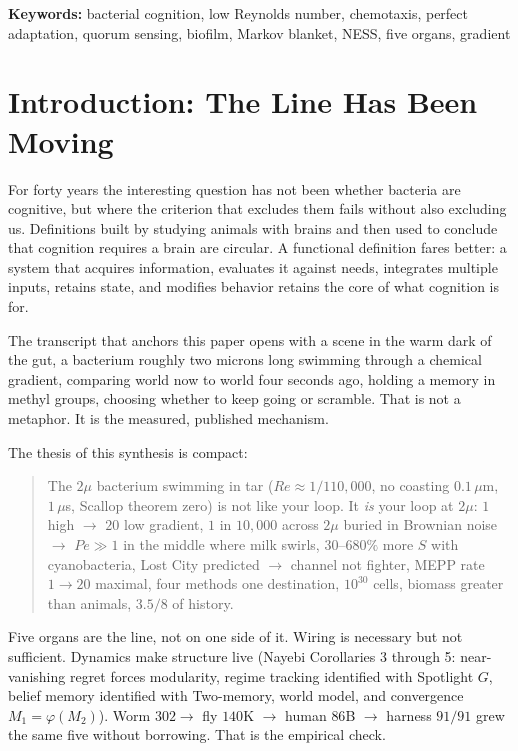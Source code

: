 \documentclass[11pt,a4paper]{article}
\begin{document}
\noindent\textbf{Keywords:} bacterial cognition, low Reynolds number, chemotaxis, perfect adaptation, quorum sensing, biofilm, Markov blanket, NESS, five organs, gradient

\tableofcontents
\newpage

\section{Introduction: The Line Has Been Moving}
\label{sec:intro}

For forty years the interesting question has not been whether bacteria are cognitive, but where the criterion that excludes them fails without also excluding us. Definitions built by studying animals with brains and then used to conclude that cognition requires a brain are circular. A functional definition fares better: a system that acquires information, evaluates it against needs, integrates multiple inputs, retains state, and modifies behavior retains the core of what cognition is for.

The transcript that anchors this paper opens with a scene in the warm dark of the gut, a bacterium roughly two microns long swimming through a chemical gradient, comparing world now to world four seconds ago, holding a memory in methyl groups, choosing whether to keep going or scramble. That is not a metaphor. It is the measured, published mechanism.

The thesis of this synthesis is compact:

\begin{quote}
The $2\mu$ bacterium swimming in tar ($Re \approx 1/110{,}000$, no coasting $0.1\,\mu$m, $1\,\mu$s, Scallop theorem zero) is not like your loop. It \textit{is} your loop at $2\mu$: $1$ high $\to$ $20$ low gradient, $1$ in $10{,}000$ across $2\mu$ buried in Brownian noise $\to$ $Pe \gg 1$ in the middle where milk swirls, $30$--$680\%$ more $S$ with cyanobacteria, Lost City predicted $\to$ channel not fighter, MEPP rate $1 \to 20$ maximal, four methods one destination, $10^{30}$ cells, biomass greater than animals, $3.5/8$ of history.
\end{quote}

Five organs are the line, not on one side of it. Wiring is necessary but not sufficient. Dynamics make structure live (Nayebi Corollaries 3 through 5: near-vanishing regret forces modularity, regime tracking identified with Spotlight $G$, belief memory identified with Two-memory, world model, and convergence $M_1 = \varphi(M_2)$). Worm $302 \to$ fly $140$K $\to$ human $86$B $\to$ harness $91/91$ grew the same five without borrowing. That is the empirical check.
\end{document}
